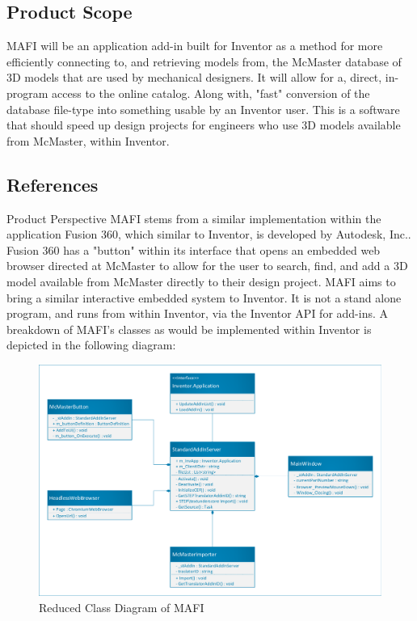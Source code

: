 \documentclass[12pt, letterpaper]{article}
\begin{document}
\subsection{Product Scope}
MAFI will be an application add-in built for Inventor as a method for more efficiently connecting to, and retrieving models from, the McMaster database of 3D models that are used by mechanical designers. It will allow for a, direct, in-program access to the online catalog. Along with, "fast" conversion of the database file-type into something usable by an Inventor user. This is a software that should speed up design projects for engineers who use 3D models available from McMaster, within Inventor.
\subsection{References}
\begingroup
\renewcommand{\section}[2]{}


\endgroup
\newpage
\section{General Description}
\subsection{Product Perspective}
MAFI stems from a similar implementation within the application Fusion 360, which similar to Inventor, is developed by Autodesk, Inc.. Fusion 360 
has a "button" within its interface that opens an embedded web browser directed at McMaster to allow for the user to search, find, and add a 3D model 
available from McMaster directly to their design project. MAFI aims to bring a similar interactive embedded system to Inventor. It is not a stand alone 
program, and runs from within Inventor, via the Inventor API for add-ins. A breakdown of MAFI's classes as would be implemented within Inventor is depicted 
in the following diagram:
\begin{figure}[H]
    \begin{center}
        \includegraphics[width=1\textwidth]{Figures/Class_Diagram.pdf}
    \end{center}
    \caption{Reduced Class Diagram of MAFI}
\end{figure}
\end{document}
